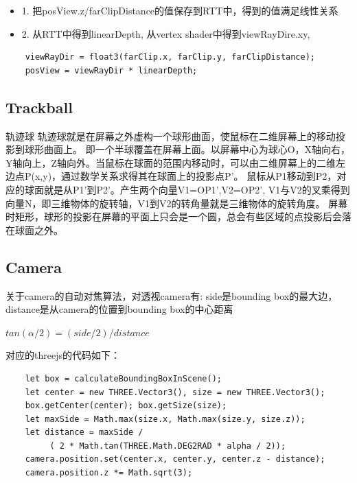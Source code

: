 \begin{itemize}
    \item {1. 把posView.z/farClipDistance的值保存到RTT中，得到的值满足线性关系}
    \item {2. 从RTT中得到linearDepth, 从vertex shader中得到viewRayDire.xy, }
\end{itemize}

\begin{lstlisting}
    viewRayDir = float3(farClip.x, farClip.y, farClipDistance);
    posView = viewRayDir * linearDepth;
\end{lstlisting}

\subsection{Trackball}
轨迹球\cite{Trackball}
轨迹球就是在屏幕之外虚构一个球形曲面，使鼠标在二维屏幕上的移动投影到球形曲面上。
即一个半球覆盖在屏幕上面。以屏幕中心为球心O，X轴向右，Y轴向上，Z轴向外。当鼠标在球面的范围内移动时，可以由二维屏幕上的二维左边点P(x,y)，通过数学关系求得其在球面上的投影点P'。
鼠标从P1移动到P2，对应的球面就是从P1'到P2'。产生两个向量V1=OP1',V2=OP2',  
V1与V2的叉乘得到向量N，即三维物体的旋转轴，V1到V2的转角量就是三维物体的旋转角度。
屏幕时矩形，球形的投影在屏幕的平面上只会是一个圆，总会有些区域的点投影后会落在球面之外。

\subsection{Camera}

关于camera的自动对焦算法，对透视camera有: side是bounding box的最大边， distance是从camera的位置到bounding box的中心距离

\begin{math}
    tan(\alpha / 2) = (side / 2) / distance
\end{math}

对应的threejs的代码如下：

\begin{lstlisting}
    let box = calculateBoundingBoxInScene();
    let center = new THREE.Vector3(), size = new THREE.Vector3();
    box.getCenter(center); box.getSize(size);
    let maxSide = Math.max(size.x, Math.max(size.y, size.z));    
    let distance = maxSide /
         ( 2 * Math.tan(THREE.Math.DEG2RAD * alpha / 2));  
    camera.position.set(center.x, center.y, center.z - distance);
    camera.position.z *= Math.sqrt(3);
\end{lstlisting}




